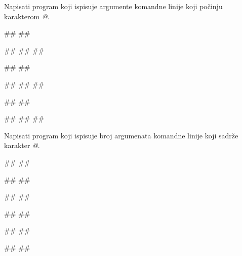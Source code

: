 \begin{Exercise}[label=p2.6_02] 
Napisati program koji ispisuje argumente komandne linije koji počinju karakterom \textit{@}.

\begin{minitest}
\begin{upotreba}{1}
#\naslovPokretanje#
##

#\naslovIzlaz#
##
##
\end{upotreba}
\end{minitest}
\begin{minitest}
\begin{upotreba}{2}
#\naslovPokretanje#
##

#\naslovIzlaz#
##
##
\end{upotreba}
\end{minitest}
\begin{minitest}
\begin{upotreba}{3}
#\naslovPokretanje#
##

#\naslovIzlaz#
##
##
\end{upotreba}
\end{minitest}

\end{Exercise}
\ifresenja
\begin{Answer}[ref=p2.6_02]
\end{Answer}
 \fi


\begin{Exercise}[label=p2.6_03] 
Napisati program koji ispisuje broj argumenata komandne linije koji sadrže karakter \textit{@}.

\begin{minitest}
\begin{upotreba}{1}
#\naslovPokretanje#
##

#\naslovIzlaz#
##
\end{upotreba}
\end{minitest}
\begin{minitest}
\begin{upotreba}{2}
#\naslovPokretanje#
##

#\naslovIzlaz#
##
\end{upotreba}
\end{minitest}
\begin{minitest}
\begin{upotreba}{3}
#\naslovPokretanje#
##

#\naslovIzlaz#
##
\end{upotreba}
\end{minitest}


\end{Exercise}
\ifresenja
\begin{Answer}[ref=p2.6_03]
\end{Answer}
 \fi


